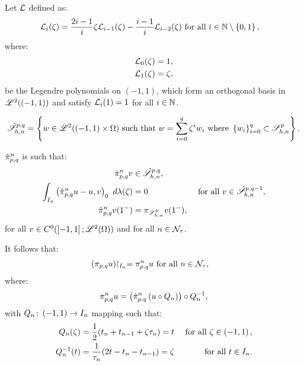 \begin{definition}
    Let $\mathcal{L}$ defined as:
    \begin{align}
        \mathcal{L}_{i}(\zeta) = \frac{2i - 1}{i} \zeta \mathcal{L}_{i - 1}(\zeta) - \frac{i - 1}{i} \mathcal{L}_{i - 2}(\zeta) &\text{ for all } i \in \mathbb{N} \setminus \left\{ 0, 1 \right\},
    \end{align}
    where:
    \begin{align}
        \mathcal{L}_{0}(\zeta) &= 1, \\
        \mathcal{L}_{1}(\zeta) &= \zeta,
    \end{align}
    be the Legendre polynomials on $\left( -1, 1 \right)$, which form an orthogonal basis in $\mathscr{L}^{2}(\left( -1, 1 \right))$ and satisfy $\mathcal{L}_i(1) = 1$ for all $i \in \mathbb{N}$.
\end{definition}

\begin{definition}[$\SpaceSolutionReference$]
    \begin{align}
        \hat{\mathscr{S}}^{p, q}_{h, n} = \left\{ w \in \mathscr{L}^{2}(\left( -1, 1 \right) \times \Omega) \text{ such that } w = \sum_{i = 0}^q \zeta^i w_i \text{ where } \left\{ w_i \right\}_{i = 0}^q \subset \mathscr{S}_{h, n}^p \right\}.
    \end{align}
\end{definition}

\begin{definition}[$\InterpolantPQR$] \label{definition:interpolant_ref_qp}
    $\InterpolantPQR$ is such that:
    \begin{align}
        \hat{\pi}_{p, q}^n v &\in \hat{\mathscr{S}}^{p, q}_{h, n}, \\
        \int_{I_n} \left( \hat{\pi}_{p, q}^n u - u, v \right)_0 ~ d \lambda(\zeta) &= 0 &\text{ for all } v \in \hat{\mathscr{S}}^{p, q - 1}_{h, n}, \\ 
        \hat{\pi}_{p, q}^n v(1^-) &= \pi_{\mathscr{S}^p_{h, n}} v(1^-),
    \end{align}
    for all $v \in C^0(\left[ -1, 1 \right]; \mathscr{L}^{2}(\Omega))$ and for all $n \in \mathcal{N}_{\tau}$.
\end{definition}

It follows that:
\begin{align}
    \left( \pi_{p, q} u \right) \!\!\restriction_{I_n} = \pi_{p, q}^n u &\text{ for all } n \in \mathcal{N}_{\tau},
\end{align}
where:
\begin{align}
    \pi_{p, q}^n u = \left( \hat{\pi}_{p, q}^n \left( u \circ Q_n \right) \right) \circ Q_n^{-1},
\end{align}
with $Q_n \colon \left( -1, 1 \right) \rightarrow I_n$ mapping such that:
\begin{align}
    Q_n(\zeta) &= \frac{1}{2}(t_n + t_{n - 1} + \zeta \tau_n) = t &\text{ for all } \zeta \in \left( -1, 1 \right), \\
    Q_n^{-1}(t) &= \frac{1}{\tau_n}(2t - t_n - t_{n - 1}) = \zeta &\text{ for all } t \in I_n.
\end{align}

